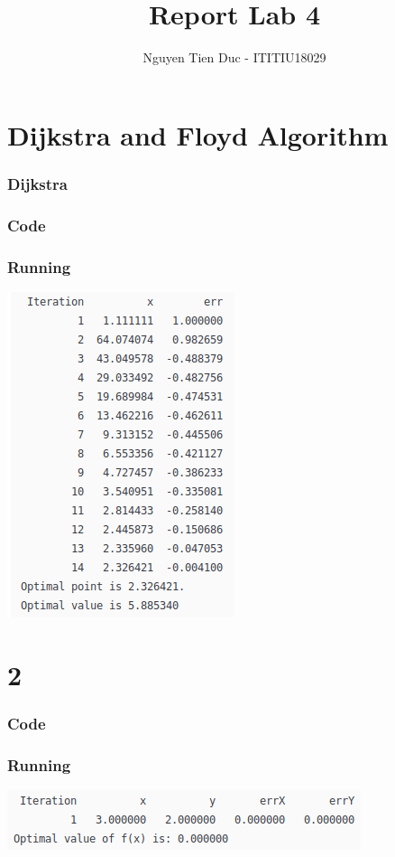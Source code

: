 \documentclass[12pt]{article}
\begin{document}
  \title{Report Lab 4}
  \author{Nguyen Tien Duc - ITITIU18029}
  \maketitle
  \part*{Dijkstra and Floyd Algorithm}
    \section{Dijkstra}
    \section*{Code}
      
    \section*{Running}
    \begin{center}
      \includegraphics{Newton.png}
    \end{center}
  \part*{2}
    \section*{Code}
      
    \section*{Running}
      \begin{center}
        \includegraphics{SteepestDescent.png}
      \end{center}
\end{document}
